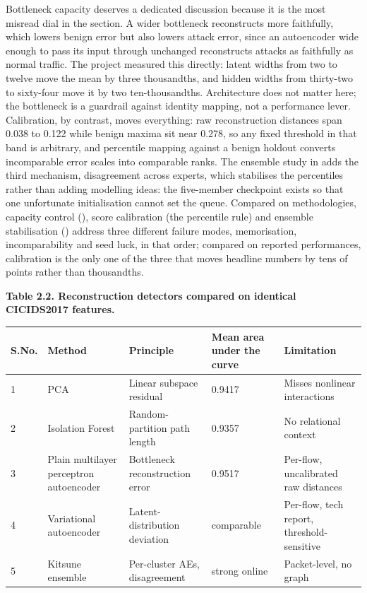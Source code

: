 Bottleneck capacity deserves a dedicated discussion because it is the most misread dial in the section. A wider bottleneck reconstructs more faithfully, which lowers benign error but also lowers attack error, since an autoencoder wide enough to pass its input through unchanged reconstructs attacks as faithfully as normal traffic. The project measured this directly: latent widths from two to twelve move the mean by three thousandths, and hidden widths from thirty-two to sixty-four move it by two ten-thousandths. Architecture does not matter here; the bottleneck is a guardrail against identity mapping, not a performance lever. Calibration, by contrast, moves everything: raw reconstruction distances span 0.038 to 0.122 while benign maxima sit near 0.278, so any fixed threshold in that band is arbitrary, and percentile mapping against a benign holdout converts incomparable error scales into comparable ranks. The ensemble study in \cite{k13} adds the third mechanism, disagreement across experts, which stabilises the percentiles rather than adding modelling ideas: the five-member checkpoint exists so that one unfortunate initialisation cannot set the queue. Compared on methodologies, capacity control (\cite{k12}), score calibration (the percentile rule) and ensemble stabilisation (\cite{k13}) address three different failure modes, memorisation, incomparability and seed luck, in that order; compared on reported performances, calibration is the only one of the three that moves headline numbers by tens of points rather than thousandths.

\begin{center}\textbf{Table 2.2. Reconstruction detectors compared on identical CICIDS2017 features.}\end{center}

\begin{center}
\begin{tabular}{lllll}
\toprule

S.No. & Method & Principle & Mean area under the curve & Limitation \\

\midrule

1 & PCA & Linear subspace residual & 0.9417 & Misses nonlinear interactions \\

2 & Isolation Forest \cite{k10} & Random-partition path length & 0.9357 & No relational context \\

3 & Plain multilayer perceptron autoencoder \cite{k12} & Bottleneck reconstruction error & 0.9517 & Per-flow, uncalibrated raw distances \\

4 & Variational autoencoder \cite{k11} & Latent-distribution deviation & comparable & Per-flow, tech report, threshold-sensitive \\

5 & Kitsune ensemble \cite{k13} & Per-cluster AEs, disagreement & strong online & Packet-level, no graph \\

\bottomrule
\end{tabular}
\end{center}

